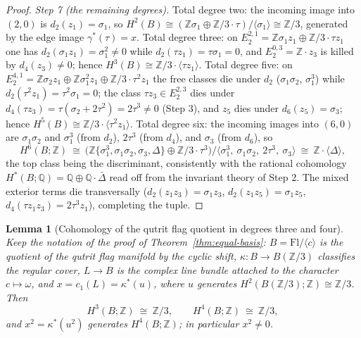 \documentclass[11pt,a4paper]{article}
\newtheorem{lemma}[theorem]{Lemma}
\begin{document}
\begin{proof}
\emph{Step 7 (the remaining degrees).} Total degree two: the incoming image
into $(2,0)$ is $d_2(z_1)=\sigma_1$, so
$H^2(B)\cong(\mathbb Z\sigma_1\oplus\mathbb Z/3\cdot\tau)/\langle\sigma_1
\rangle\cong\mathbb Z/3$, generated by the edge image
$\gamma^*(\tau)=x$. Total degree three: on
$E_2^{2,1}=\mathbb Z\sigma_1z_1\oplus\mathbb Z/3\cdot\tau z_1$ one has
$d_2(\sigma_1z_1)=\sigma_1^2\ne0$ while $d_2(\tau z_1)=\tau\sigma_1=0$, and
$E_2^{0,3}=\mathbb Z\cdot z_3$ is killed by $d_4(z_3)\ne0$; hence
$H^3(B)\cong\mathbb Z/3\cdot\langle\tau z_1\rangle$. Total degree five: on
$E_2^{4,1}=\mathbb Z\sigma_2z_1\oplus\mathbb Z\sigma_1^2z_1\oplus\mathbb
Z/3\cdot\tau^2z_1$ the free classes die under $d_2$
($\sigma_1\sigma_2$, $\sigma_1^3$) while $d_2(\tau^2z_1)=\tau^2\sigma_1=0$;
the class $\tau z_3\in E_2^{2,3}$ dies under $d_4(\tau z_3)=
\tau(\sigma_2+2\tau^2)=2\tau^3\ne0$ (Step 3), and $z_5$ dies under
$d_6(z_5)=\sigma_3$; hence $H^5(B)\cong\mathbb Z/3\cdot\langle\tau^2z_1
\rangle$. Total degree six: the incoming images into $(6,0)$ are
$\sigma_1\sigma_2$ and $\sigma_1^3$ (from $d_2$), $2\tau^3$ (from $d_4$),
and $\sigma_3$ (from $d_6$), so
\[
H^6(B;\mathbb Z)\ \cong\ \bigl(\mathbb Z\{\sigma_1^3,\sigma_1\sigma_2,
\sigma_3,\Delta\}\oplus\mathbb Z/3\cdot\tau^3\bigr)\big/\langle\sigma_1^3,\
\sigma_1\sigma_2,\ 2\tau^3,\ \sigma_3\rangle\ \cong\ \mathbb Z\cdot
\langle\Delta\rangle,
\]
the top class being the discriminant, consistently with the rational
cohomology $H^*(B;\mathbb Q)=\mathbb Q\oplus\mathbb Q\cdot\bar\Delta$ read
off from the invariant theory of Step 2. The mixed exterior terms die
transversally ($d_2(z_1z_3)=\sigma_1z_3$, $d_2(z_1z_5)=\sigma_1z_5$,
$d_4(\tau z_1z_3)=2\tau^3z_1$), completing the tuple.
\end{proof}

\begin{lemma}[Cohomology of the qutrit flag quotient in degrees three and four]
\label{lem:flag-cohomology}
Keep the notation of the proof of Theorem~\ref{thm:equal-basis}:
$B=\mathrm{Fl}/\langle c\rangle$ is the quotient of the qutrit flag manifold by
the cyclic shift, $\kappa\colon B\to B(\mathbb Z/3)$ classifies the regular
cover, $L\to B$ is the complex line bundle attached to the character
$c\mapsto\omega$, and $x=c_1(L)=\kappa^*(u)$, where $u$ generates
$H^2(B(\mathbb Z/3);\mathbb Z)\cong\mathbb Z/3$. Then
\[
H^3(B;\mathbb Z)\ \cong\ \mathbb Z/3,
\qquad
H^4(B;\mathbb Z)\ \cong\ \mathbb Z/3,
\]
and $x^2=\kappa^*(u^2)$ generates $H^4(B;\mathbb Z)$; in particular $x^2\ne0$.
\end{lemma}
\end{document}
